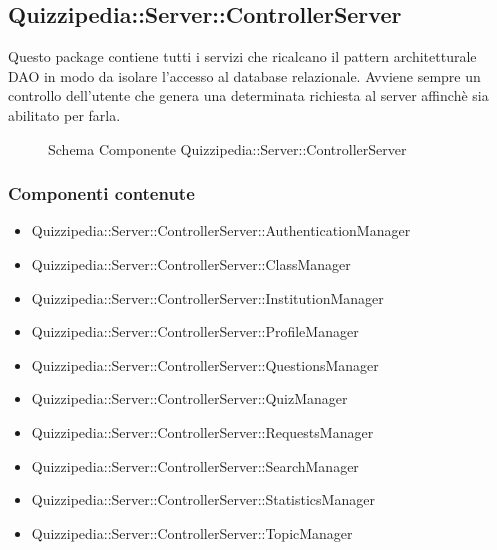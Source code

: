 \subsection{Quizzipedia::Server::ControllerServer}
Questo package contiene tutti i servizi che ricalcano il pattern architetturale DAO in modo da isolare l'accesso al database relazionale. Avviene sempre un controllo dell'utente che genera una determinata richiesta al server affinchè sia abilitato per farla.
\begin{figure}[H]
\centering
\noindent{}
\caption[Schema Componente Quizzipedia::Server::ControllerServer]{Schema Componente Quizzipedia::Server::ControllerServer}
\end{figure}
\subsubsection{Componenti contenute}
\begin{itemize}
\item Quizzipedia::Server::ControllerServer::AuthenticationManager
\item Quizzipedia::Server::ControllerServer::ClassManager
\item Quizzipedia::Server::ControllerServer::InstitutionManager
\item Quizzipedia::Server::ControllerServer::ProfileManager
\item Quizzipedia::Server::ControllerServer::QuestionsManager
\item Quizzipedia::Server::ControllerServer::QuizManager
\item Quizzipedia::Server::ControllerServer::RequestsManager
\item Quizzipedia::Server::ControllerServer::SearchManager
\item Quizzipedia::Server::ControllerServer::StatisticsManager
\item Quizzipedia::Server::ControllerServer::TopicManager
\end{itemize}
